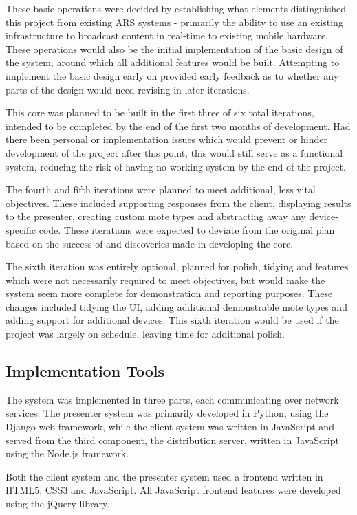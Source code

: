 \documentclass[a4papert,11pt,notitlepage]{ltxdoc}
\begin{document}
These basic operations were decided by establishing what elements distinguished this project from existing ARS systems - primarily the ability to use an existing infrastructure to broadcast content in real-time to existing mobile hardware. These operations would also be the initial implementation of the basic design of the system, around which all additional features would be built. Attempting to implement the basic design early on provided early feedback as to whether any parts of the design would need revising in later iterations.

This core was planned to be built in the first three of six total iterations, intended to be completed by the end of the first two months of development. Had there been personal or implementation issues which would prevent or hinder development of the project after this point, this would still serve as a functional system, reducing the risk of having no working system by the end of the project.

The fourth and fifth iterations were planned to meet additional, less vital objectives. These included supporting responses from the client, displaying results to the presenter, creating custom mote types and abstracting away any device-specific code. These iterations were expected to deviate from the original plan based on the success of and discoveries made in developing the core.

The sixth iteration was entirely optional, planned for polish, tidying and features which were not necessarily required to meet objectives, but would make the system seem more complete for demonstration and reporting purposes. These changes included tidying the UI, adding additional demonstrable mote types and adding support for additional devices. This sixth iteration would be used if the project was largely on schedule, leaving time for additional polish.

\subsection{Implementation Tools}
The system was implemented in three parts, each communicating over network services. The presenter system was primarily developed in Python\cite{python:web}, using the Django\cite{django:web} web framework, while the client system was written in JavaScript and served from the third component, the distribution server, written in JavaScript using the Node.js\cite{nodejs:web} framework.

Both the client system and the presenter system used a frontend written in HTML5, CSS3 and JavaScript. All JavaScript frontend features were developed using the jQuery\cite{jquery:web} library.
\end{document}
